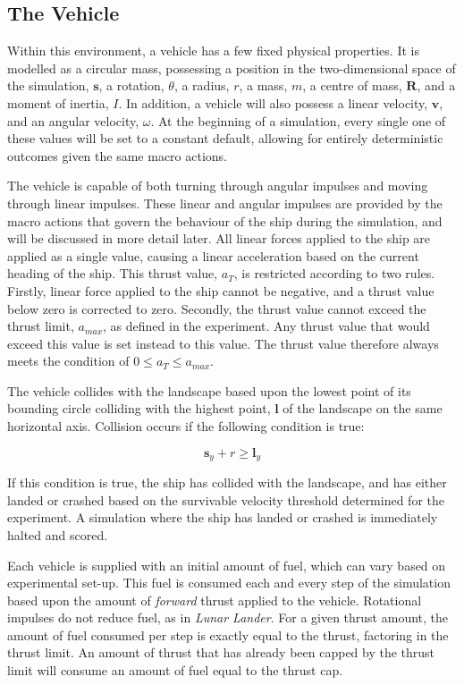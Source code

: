 \documentclass[conference]{IEEEtran}
\begin{document}
\subsection{The Vehicle}
Within this environment, a vehicle has a few fixed physical properties. It is modelled as a circular mass, possessing a position in the two-dimensional space of the simulation, $\boldsymbol {s}$, a rotation, $\theta$, a radius, $r$, a mass, $m$, a centre of mass, $\boldsymbol {R}$, and a moment of inertia, $I$. In addition, a vehicle will also possess a linear velocity, $\boldsymbol {v}$, and an angular velocity, $\omega$. At the beginning of a simulation, every single one of these values will be set to a constant default, allowing for entirely deterministic outcomes given the same macro actions.

The vehicle is capable of both turning through angular impulses and moving through linear impulses. These linear and angular impulses are provided by the macro actions that govern the behaviour of the ship during the simulation, and will be discussed in more detail later. All linear forces applied to the ship are applied as a single value, causing a linear acceleration based on the current heading of the ship. This thrust value, $a_{T}$, is restricted according to two rules. Firstly, linear force applied to the ship cannot be negative, and a thrust value below zero is corrected to zero. Secondly, the thrust value cannot exceed the thrust limit, $a_{max}$, as defined in the experiment. Any thrust value that would exceed this value is set instead to this value. The thrust value therefore always meets the condition of $0 \leq a_{T} \leq a_{max}$.

The vehicle collides with the landscape based upon the lowest point of its bounding circle colliding with the highest point, $\boldsymbol {l}$ of the landscape on the same horizontal axis. Collision occurs if the following condition is true:

\begin{equation}
\boldsymbol {s}_{y} + r \geq \boldsymbol {l}_{y}
\end{equation}

If this condition is true, the ship has collided with the landscape, and has either landed or crashed based on the survivable velocity threshold determined for the experiment. A simulation where the ship has landed or crashed is immediately halted and scored.

Each vehicle is supplied with an initial amount of fuel, which can vary based on experimental set-up. This fuel is consumed each and every step of the simulation based upon the amount of {\itshape forward} thrust applied to the vehicle. Rotational impulses do not reduce fuel, as in {\itshape Lunar Lander}. For a given thrust amount, the amount of fuel consumed per step is exactly equal to the thrust, factoring in the thrust limit. An amount of thrust that has already been capped by the thrust limit will consume an amount of fuel equal to the thrust cap.
\end{document}
